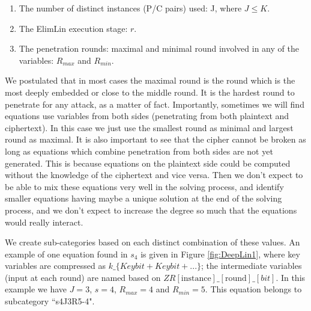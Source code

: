 \begin{enumerate}
	\item The number of distinct instances (P/C pairs) used: J, where $J \leq K$.
	\item The ElimLin execution stage: $r$.
	\item The penetration rounds: 
	maximal and minimal round involved in any of the variables: $R_{max}$ and $R_{min}$. 
\end{enumerate} 

We postulated that in most cases the maximal round is the round which is the most deeply embedded or close to the middle round. It is the hardest round to penetrate for any attack, as a matter of fact. Importantly, sometimes we will find equations use variables from both sides (penetrating from both plaintext and ciphertext). 
In this case we just use the smallest round as minimal and largest round as maximal. 
It is also important to see that the cipher cannot be broken as long as equations which combine penetration from both sides are not yet generated. This is because equations on the plaintext side could be computed without the knowledge of the ciphertext and vice versa. Then we don't expect to be able to mix these equations very well in the solving process, and identify smaller equations having maybe a unique solution at the end of the solving process, and we don't expect to increase the degree so much that the equations would really interact. 

We create sub-categories based on each distinct combination of these values. An example of one equation found in $s_4$ is given in Figure \ref{fig:DeepLin1}, where key variables are compressed as $k\_\{Keybit+Keybit+...\}$; the intermediate variables (input at each round) are named based on $ZR\left[\text{instance}\right]\_\left[ \text{round}\right]\_\left[bit\right] $. In this example we have $J=3$, $s = 4$, $R_{max} = 4$ and $R_{min}=5$. This equation belongs to subcategory ``s4J3R5-4". 

